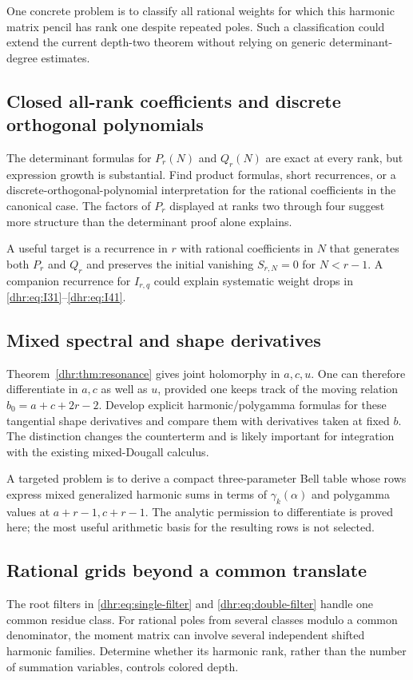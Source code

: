 \documentclass[11pt,letterpaper]{article}
\numberwithin{equation}{section}
\theoremstyle{definition}\newtheorem{definition}[theorem]{Definition}
\theoremstyle{remark}\newtheorem{remark}[theorem]{Remark}
\begin{document}
One concrete problem is to classify all rational weights for which
this harmonic matrix pencil has rank one despite repeated poles.
Such a classification could extend the current depth-two theorem
without relying on generic determinant-degree estimates.

\subsection{Closed all-rank coefficients and discrete orthogonal polynomials}
The determinant formulas for $P_r(N)$ and $Q_r(N)$ are exact at every
rank, but expression growth is substantial. Find product formulas,
short recurrences, or a discrete-orthogonal-polynomial interpretation
for the rational coefficients in the canonical case. The factors of
$P_r$ displayed at ranks two through four suggest more structure
than the determinant proof alone explains.

A useful target is a recurrence in $r$ with rational coefficients in
$N$ that generates both $P_r$ and $Q_r$ and preserves the initial
vanishing $S_{r,N}=0$ for $N<r-1$. A companion recurrence for
$I_{r,q}$ could explain systematic weight drops in
\eqref{dhr:eq:I31}--\eqref{dhr:eq:I41}.

\subsection{Mixed spectral and shape derivatives}
Theorem~\ref{dhr:thm:resonance} gives joint holomorphy in $a,c,u$.
One can therefore differentiate in $a,c$ as well as $u$, provided
one keeps track of the moving relation $b_0=a+c+2r-2$.
Develop explicit harmonic/polygamma formulas for these tangential
shape derivatives and compare them with derivatives taken at fixed
$b$. The distinction changes the counterterm and is likely important
for integration with the existing mixed-Dougall calculus.

A targeted problem is to derive a compact three-parameter Bell table
whose rows express mixed generalized harmonic sums in terms of
$\gamma_k(\alpha)$ and polygamma values at $a+r-1,c+r-1$.
The analytic permission to differentiate is proved here; the most
useful arithmetic basis for the resulting rows is not selected.

\subsection{Rational grids beyond a common translate}
The root filters in \eqref{dhr:eq:single-filter} and
\eqref{dhr:eq:double-filter} handle one common residue class.
For rational poles from several classes modulo a common denominator,
the moment matrix can involve several independent shifted harmonic
families. Determine whether its harmonic rank, rather than the number
of summation variables, controls colored depth.
\end{document}
